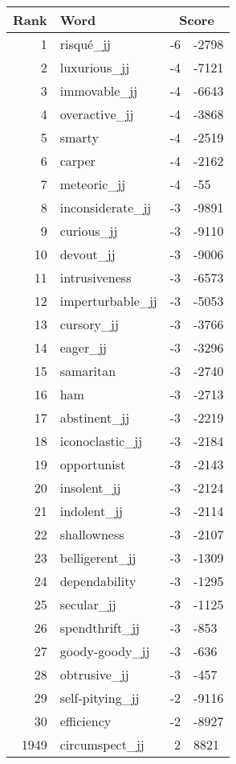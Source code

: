 \begin{longtable}[!htbp]{| rlr@{.}l |}
    \hline
    \textbf{Rank} & \textbf{Word} & \multicolumn{2}{c|}{\textbf{Score}} \\
    \hline
    \endhead
    1 & risqué\_jj & -6 & -2798 \\
    2 & luxurious\_jj & -4 & -7121 \\
    3 & immovable\_jj & -4 & -6643 \\
    4 & overactive\_jj & -4 & -3868 \\
    5 & smarty & -4 & -2519 \\
    6 & carper & -4 & -2162 \\
    7 & meteoric\_jj & -4 & -55 \\
    8 & inconsiderate\_jj & -3 & -9891 \\
    9 & curious\_jj & -3 & -9110 \\
    10 & devout\_jj & -3 & -9006 \\
    11 & intrusiveness & -3 & -6573 \\
    12 & imperturbable\_jj & -3 & -5053 \\
    13 & cursory\_jj & -3 & -3766 \\
    14 & eager\_jj & -3 & -3296 \\
    15 & samaritan & -3 & -2740 \\
    16 & ham & -3 & -2713 \\
    17 & abstinent\_jj & -3 & -2219 \\
    18 & iconoclastic\_jj & -3 & -2184 \\
    19 & opportunist & -3 & -2143 \\
    20 & insolent\_jj & -3 & -2124 \\
    21 & indolent\_jj & -3 & -2114 \\
    22 & shallowness & -3 & -2107 \\
    23 & belligerent\_jj & -3 & -1309 \\
    24 & dependability & -3 & -1295 \\
    25 & secular\_jj & -3 & -1125 \\
    26 & spendthrift\_jj & -3 & -853 \\
    27 & goody-goody\_jj & -3 & -636 \\
    28 & obtrusive\_jj & -3 & -457 \\
    29 & self-pitying\_jj & -2 & -9116 \\
    30 & efficiency & -2 & -8927 \\
    1949 & circumspect\_jj & 2 & 8821 \\

\end{longtable}
